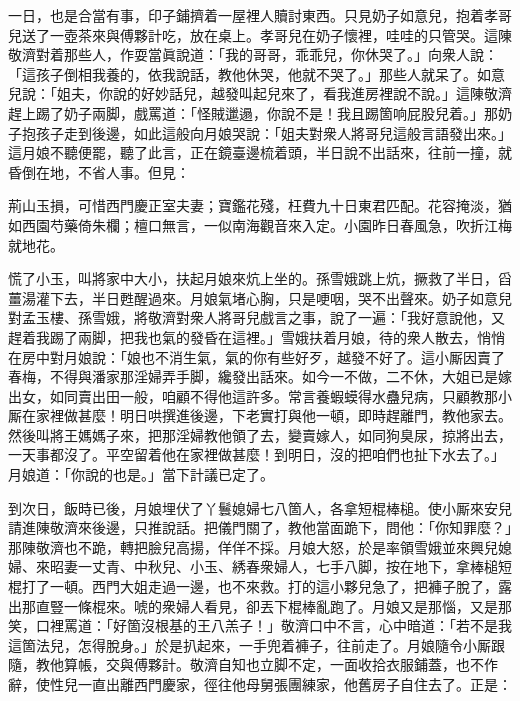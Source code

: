 一日，也是合當有事，印子鋪擠着一屋裡人贖討東西。只見奶子如意兒，抱着孝哥兒送了一壺茶來與傅夥計吃，放在桌上。孝哥兒在奶子懷裡，哇哇的只管哭。這陳敬濟對着那些人，作耍當眞說道：「我的哥哥，乖乖兒，你休哭了。」向衆人說：「這孩子倒相我養的，依我說話，教他休哭，他就不哭了。」{}那些人就呆了。如意兒說：「姐夫，你說的好妙話兒，越發叫起兒來了，看我進房裡說不說。」這陳敬濟趕上踢了奶子兩脚，戲罵道：「怪賊邋遢，你說不是！我且踢箇响屁股兒着。」{}那奶子抱孩子走到後邊，如此這般向月娘哭說：「姐夫對衆人將哥兒這般言語發出來。」這月娘不聽便罷，聽了此言，正在鏡臺邊梳着頭，半日說不出話來，往前一撞，就昏倒在地，不省人事。但見：

\begin{myquote}
荊山玉損，可惜西門慶正室夫妻；寶鑑花殘，枉費九十日東君匹配。花容掩淡，猶如西園芍藥倚朱欄；檀口無言，一似南海觀音來入定。小園昨日春風急，吹折江梅就地花。
\end{myquote}

慌了小玉，叫將家中大小，扶起月娘來炕上坐的。孫雪娥跳上炕，撅救了半日，舀薑湯灌下去，半日甦醒過來。月娘氣堵心胸，只是哽咽，哭不出聲來。奶子如意兒對孟玉樓、孫雪娥，將敬濟對衆人將哥兒戲言之事，說了一遍：「我好意說他，又趕着我踢了兩脚，把我也氣的發昏在這裡。」雪娥扶着月娘，待的衆人散去，悄悄在房中對月娘說：「娘也不消生氣，氣的你有些好歹，越發不好了。這小厮因賣了春梅，不得與潘家那淫婦弄手脚，纔發出話來。如今一不做，二不休，大姐已是嫁出女，如同賣出田一般，咱顧不得他這許多。常言養蝦蟆得水蠱兒病，只顧教那小厮在家裡做甚麼！明日哄撰進後邊，下老實打與他一頓，即時趕離門，教他家去。然後叫將王媽媽子來，把那淫婦教他領了去，變賣嫁人，如同狗臭尿，掠將出去，一天事都沒了。平空留着他在家裡做甚麼！到明日，沒的把咱們也扯下水去了。」{}月娘道：「你說的也是。」當下計議已定了。

到次日，飯時已後，月娘埋伏了丫鬟媳婦七八箇人，各拿短棍棒槌。使小厮來安兒請進陳敬濟來後邊，只推說話。把儀門關了，教他當面跪下，問他：「你知罪麼？」那陳敬濟也不跪，轉把臉兒高揚，佯佯不採。月娘大怒，於是率領雪娥並來興兒媳婦、來昭妻一丈青、中秋兒、小玉、綉春衆婦人，七手八脚，按在地下，拿棒槌短棍打了一頓。西門大姐走過一邊，也不來救。打的這小夥兒急了，把褲子脫了，露出那直豎一條棍來。{}唬的衆婦人看見，卻丟下棍棒亂跑了。月娘又是那惱，又是那笑，口裡罵道：「好箇沒根基的王八羔子！」敬濟口中不言，心中暗道：「若不是我這箇法兒，怎得脫身。」於是扒起來，一手兜着褲子，往前走了。月娘隨令小厮跟隨，教他算帳，交與傅夥計。敬濟自知也立脚不定，一面收拾衣服鋪蓋，也不作辭，使性兒一直出離西門慶家，徑往他母舅張團練家，他舊房子自住去了。正是：

